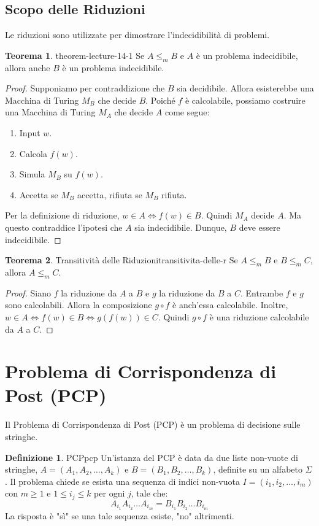 \documentclass[a4paper]{article}
\theoremstyle{definition} %
\newtheorem{theorem}{Teorema}
\newtheorem{definition}{Definizione}
\theoremstyle{remark} %
\begin{document}
\subsection{Scopo delle Riduzioni}

Le riduzioni sono utilizzate per dimostrare l'indecidibilità di problemi.
\begin{theorem}{}{{ theorem-lecture-14-1 }}
Se $A \le_m B$ e $A$ è un problema indecidibile, allora anche $B$ è un problema indecidibile.
\end{theorem}
\begin{proof}
Supponiamo per contraddizione che $B$ sia decidibile. Allora esisterebbe una Macchina di Turing $M_B$ che decide $B$.
Poiché $f$ è calcolabile, possiamo costruire una Macchina di Turing $M_A$ che decide $A$ come segue:
\begin{enumerate}
    \item Input $w$.
    \item Calcola $f(w)$.
    \item Simula $M_B$ su $f(w)$.
    \item Accetta se $M_B$ accetta, rifiuta se $M_B$ rifiuta.
\end{enumerate}
Per la definizione di riduzione, $w \in A \iff f(w) \in B$. Quindi $M_A$ decide $A$. Ma questo contraddice l'ipotesi che $A$ sia indecidibile. Dunque, $B$ deve essere indecidibile.
\end{proof}

\begin{theorem}{Transitività delle Riduzioni}{transitivita-delle-r}
Se $A \le_m B$ e $B \le_m C$, allora $A \le_m C$.
\end{theorem}
\begin{proof}
Siano $f$ la riduzione da $A$ a $B$ e $g$ la riduzione da $B$ a $C$.
Entrambe $f$ e $g$ sono calcolabili. Allora la composizione $g \circ f$ è anch'essa calcolabile.
Inoltre, $w \in A \iff f(w) \in B \iff g(f(w)) \in C$.
Quindi $g \circ f$ è una riduzione calcolabile da $A$ a $C$.
\end{proof}

\section{Problema di Corrispondenza di Post (PCP)}

Il Problema di Corrispondenza di Post (PCP) è un problema di decisione sulle stringhe.

\begin{definition}{PCP}{pcp}
Un'istanza del PCP è data da due liste non-vuote di stringhe, $A = (A_1, A_2, \dots, A_k)$ e $B = (B_1, B_2, \dots, B_k)$, definite su un alfabeto $\Sigma$.
Il problema chiede se esista una sequenza di indici non-vuota $I = (i_1, i_2, \dots, i_m)$ con $m \ge 1$ e $1 \le i_j \le k$ per ogni $j$, tale che:
$$A_{i_1} A_{i_2} \dots A_{i_m} = B_{i_1} B_{i_2} \dots B_{i_m}$$
La risposta è "sì" se una tale sequenza esiste, "no" altrimenti.
\end{definition}
\end{document}
